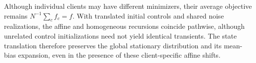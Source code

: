 Although individual clients may have different minimizers, their average objective remains $N^{-1}\sum_c f_c=f$. With translated initial controls and shared noise realizations, the affine and homogeneous \Scaf{} recursions coincide pathwise, although unrelated control initializations need not yield identical transients. The state translation therefore preserves the global stationary distribution and its mean-bias expansion, even in the presence of these client-specific affine shifts.
